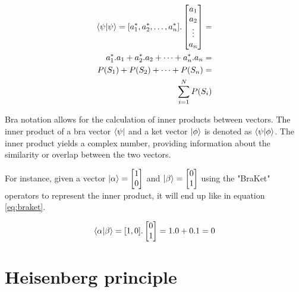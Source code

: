 			
			\begin{equation}
				\begin{aligned}
					\braket{\psi|\psi} = [a_1^*, a_2^*, \dots, a_n^*] . \begin{bmatrix}
						a_{1} \\
						a_{2} \\
						\vdots \\
						a_{n}
					\end{bmatrix} = &\\ 
					a_1^*.a_1 + a_2^*.a_2 + \dots + a_n^*.a_n = &\\
					P(S_1) + P(S_2) + \dots + P(S_n) = &\\
					\sum_{i=1}^{N} P(S_i)
				\end{aligned}
				\label{eq:multipleLevelStateBraKet}
			\end{equation}
		
			\par Bra notation allows for the calculation of inner products between vectors. The inner product of a bra vector $\bra{\psi}$ and a ket vector $\ket{\phi}$ is denoted as $\braket{\psi|\phi}$. The inner product yields a complex number, providing information about the similarity or overlap between the two vectors.\newline
			
			\par For instance, given a vector 
				$\ket{\alpha}= 
				\begin{bmatrix}
					1 \\
					0
				\end{bmatrix}
				$
				 and 
				 $\ket{\beta} = \begin{bmatrix}
					0\\
					1
				\end{bmatrix}$ 
				using the "BraKet" operators to represent the inner product, it will end up like in equation \ref{eq:braket}.
			
			\begin{equation}
				\label{eq:braket}
				\braket{\alpha|\beta} = 
				[1, 0] .
				\begin{bmatrix}
					0 \\
					1
				\end{bmatrix} = 1.0 + 0.1 = 0
			\end{equation}

	\section{Heisenberg principle}
	
